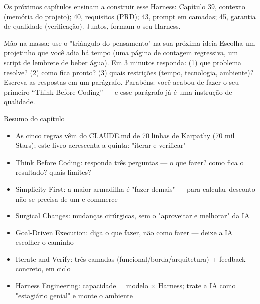 Os próximos capítulos ensinam a construir esse Harness: Capítulo 39, contexto (memória do projeto); 40, requisitos (PRD); 43, prompt em camadas; 45, garantia de qualidade (verificação). Juntos, formam o seu Harness.

\begin{tcbpractice}{Mão na massa: use o "triângulo do pensamento" na sua próxima ideia}
Escolha um projetinho que você adia há tempo (uma página de contagem regressiva, um script de lembrete de beber água). Em 3 minutos responda: (1) que problema resolve? (2) como fica pronto? (3) quais restrições (tempo, tecnologia, ambiente)? Escreva as respostas em um parágrafo. Parabéns: você acabou de fazer o seu primeiro “Think Before Coding” — e esse parágrafo já é uma instrução de qualidade.

\end{tcbpractice}

\begin{tcbsummary}{Resumo do capítulo}
\begin{itemize}
  \item As cinco regras vêm do CLAUDE.md de 70 linhas de Karpathy (70 mil Stars); este livro acrescenta a quinta: "iterar e verificar"
  \item Think Before Coding: responda três perguntas — o que fazer? como fica o resultado? quais limites?
  \item Simplicity First: a maior armadilha é "fazer demais" — para calcular desconto não se precisa de um e-commerce
  \item Surgical Changes: mudanças cirúrgicas, sem o "aproveitar e melhorar" da IA
  \item Goal-Driven Execution: diga o que fazer, não como fazer — deixe a IA escolher o caminho
  \item Iterate and Verify: três camadas (funcional/borda/arquitetura) + feedback concreto, em ciclo
  \item Harness Engineering: capacidade = modelo × Harness; trate a IA como "estagiário genial" e monte o ambiente
\end{itemize}

\end{tcbsummary}
